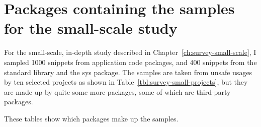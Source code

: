 

\chapter{Packages containing the samples for the small-scale study}\label{ch:survey-small-appendix-packages}

For the small-scale, in-depth study described in Chapter~\ref{ch:survey-small-scale}, I sampled 1000 snippets from
application code packages, and 400 snippets from the standard library and the sys package.
The samples are taken from unsafe usages by ten selected projects as shown in Table~\ref{tbl:survey-small-projects},
but they are made up by quite some more packages, some of which are third-party packages.

These tables show which packages make up the samples.


